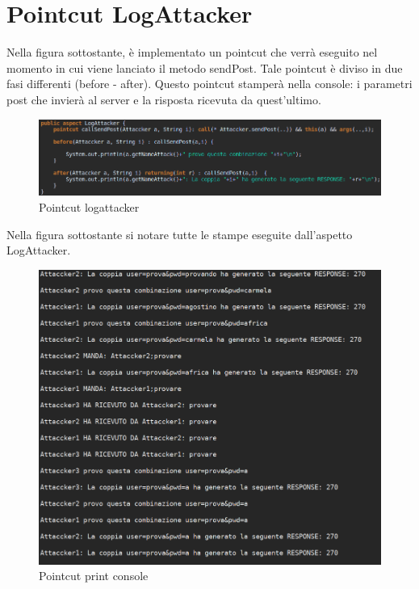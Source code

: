 \documentclass[a4paper,12pt,titlepage,oneside,openany]{book}
\begin{document}
\section{Pointcut LogAttacker}
Nella figura sottostante, è implementato un pointcut che verrà eseguito nel momento in cui viene lanciato il metodo sendPost. Tale pointcut è diviso in due fasi differenti (before - after). Questo pointcut stamperà nella console: i parametri post che invierà al server e la risposta ricevuta da quest'ultimo.
\begin{figure}[H]
	\centering
	\includegraphics[scale=0.4]{logattacker.png}
	\caption{Pointcut logattacker}
	\label{fig:logattacker}
\end{figure}
\newpage
Nella figura sottostante si notare tutte le stampe eseguite dall'aspetto LogAttacker.
\begin{figure}[H]
	\centering
	\includegraphics[scale=0.4]{jconsoleclient.png}
	\caption{Pointcut print console}
	\label{fig:jconsoleclient}
\end{figure}








\end{document}
